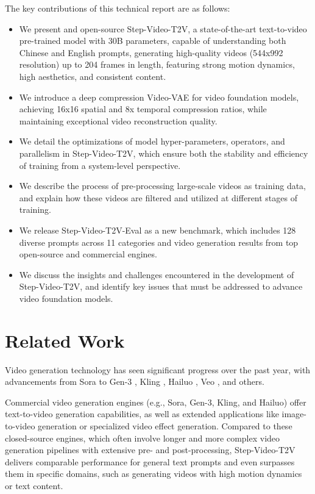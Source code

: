 The key contributions of this technical report are as follows:
\begin{itemize}[left=0cm] 
\item We present and open-source Step-Video-T2V, a state-of-the-art  text-to-video pre-trained model with 30B parameters, capable of understanding both Chinese and English prompts, generating high-quality videos (544x992 resolution) up to 204 frames in length, featuring strong motion dynamics, high aesthetics, and consistent content.
\item We introduce a deep compression Video-VAE for video foundation models, achieving 16x16 spatial and 8x temporal compression ratios, while maintaining exceptional video reconstruction quality.
\item We detail the optimizations of model hyper-parameters, operators, and parallelism in Step-Video-T2V, which ensure both the stability and efficiency of training from a system-level perspective.
\item We describe the process of pre-processing large-scale videos as training data, and explain how these videos are filtered and utilized at different stages of training.
\item We release Step-Video-T2V-Eval as a new benchmark, which includes 128 diverse prompts across 11 categories and video generation results from top open-source and commercial engines.
\item We discuss the insights and challenges encountered in the development of Step-Video-T2V, and identify key issues that must be addressed to advance video foundation models.
\end{itemize}

\section{Related Work}
Video generation technology has seen significant progress over the past year, with advancements from Sora \cite{openaisora} to Gen-3 \cite{runwaygen3}, Kling \cite{kling}, Hailuo \cite{hailuo}, Veo \cite{veo}, and others. 

Commercial video generation engines (e.g., Sora, Gen-3, Kling, and Hailuo) offer text-to-video generation capabilities, as well as extended applications like image-to-video generation or specialized video effect generation. Compared to these closed-source engines, which often involve longer and more complex video generation pipelines with extensive pre- and post-processing, Step-Video-T2V delivers comparable performance for general text prompts and even surpasses them in specific domains, such as generating videos with high motion dynamics or text content.


